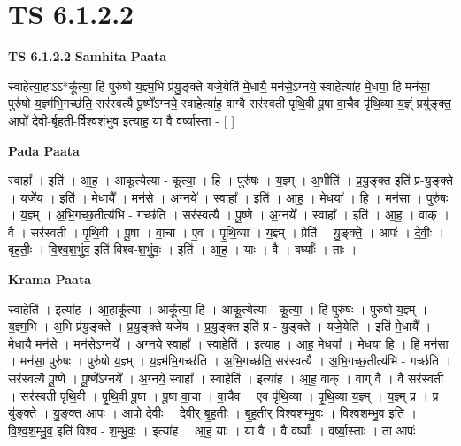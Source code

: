 \documentclass[17pt]{extarticle}
\begin{document}
\section{ TS 6.1.2.2 }

\textbf{TS 6.1.2.2 } \newline
\textbf{Samhita Paata} \newline

स्वाहेत्या॒हाऽऽ*कू᳚त्या॒ हि पुरु॑षो य॒ज्ञ्म॒भि प्र॑यु॒ङ्क्ते यजे॒येति॑ मे॒धायै॒ मन॑से॒ऽग्नये॒ स्वाहेत्या॑ह मे॒धया॒ हि मन॑सा॒ पुरु॑षो य॒ज्ञ्म॑भि॒गच्छ॑ति॒ सर॑स्वत्यै पू॒ष्णे᳚ऽग्नये॒ स्वाहेत्या॑ह॒ वाग्वै सर॑स्वती पृथि॒वी पू॒षा वा॒चैव पृ॑थि॒व्या य॒ज्ञ्ं प्रयु॑ङ्क्त॒ आपो॑ देवी-र्बृहती-र्विश्वशंभुव॒ इत्या॑ह॒ या वै वर्ष्या॒स्ता - [  ] \newline

\textbf{Pada Paata} \newline

स्वाहा᳚ । इति॑ । आ॒ह॒ । आकू॒त्येत्या - कू॒त्या॒ । हि । पुरु॑षः । य॒ज्ञ्म् । अ॒भीति॑ । प्र॒यु॒ङ्क्त इति॑ प्र-यु॒ङ्क्ते । यजे॑य । इति॑ । मे॒धायै᳚ । मन॑से । अ॒ग्नये᳚ । स्वाहा᳚ । इति॑ । आ॒ह॒ । मे॒धया᳚ । हि । मन॑सा । पुरु॑षः । य॒ज्ञ्म् । अ॒भि॒गच्छ॒तीत्य॑भि - गच्छ॑ति । सर॑स्वत्यै । पू॒ष्णे । अ॒ग्नये᳚ । स्वाहा᳚ । इति॑ । आ॒ह॒ । वाक् । वै । सर॑स्वती । पृ॒थि॒वी । पू॒षा । वा॒चा । ए॒व । पृ॒थि॒व्या । य॒ज्ञ्म् । प्रेति॑ । यु॒ङ्क्ते॒ । आपः॑ । दे॒वीः॒ । बृ॒ह॒तीः॒ । वि॒श्व॒श॒भुं॒व॒ इति॑ विश्व-श॒भुं॒वः॒ । इति॑ । आ॒ह॒ । याः । वै । वर्ष्याः᳚ । ताः ।  \newline


\textbf{Krama Paata} \newline

स्वाहेति॑ । इत्या॑ह । आ॒हाकू᳚त्या । आकू᳚त्या॒ हि । आकू॒त्येत्या - कू॒त्या॒ । हि पुरु॑षः । पुरु॑षो य॒ज्ञ्म् । य॒ज्ञ्म॒भि । अ॒भि प्र॑यु॒ङ्‍क्ते । प्र॒यु॒ङ्‍क्ते यजे॑य । प्र॒यु॒ङ्‍क्त इति॑ प्र - यु॒ङ्‍क्ते । यजे॒येति॑ । इति॑ मे॒धायै᳚ । मे॒धायै॒ मन॑से । मन॑से॒ऽग्नये᳚ । अ॒ग्नये॒ स्वाहा᳚ । स्वाहेति॑ । इत्या॑ह । आ॒ह॒ मे॒धया᳚ । मे॒धया॒ हि । हि मन॑सा । मन॑सा॒ पुरु॑षः । पुरु॑षो य॒ज्ञ्म् । य॒ज्ञ्म॑भि॒गच्छ॑ति । अ॒भि॒गच्छ॑ति॒ सर॑स्वत्यै । अ॒भि॒गच्छ॒तीत्य॑भि - गच्छ॑ति । सर॑स्वत्यै पू॒ष्णे । पू॒ष्णे᳚ऽग्नये᳚ । अ॒ग्नये॒ स्वाहा᳚ । स्वाहेति॑ । इत्या॑ह । आ॒ह॒ वाक् । वाग् वै । वै सर॑स्वती । सर॑स्वती पृथि॒वी । पृ॒थि॒वी पू॒षा । पू॒षा वा॒चा । वा॒चैव । ए॒व पृ॑थि॒व्या । पृ॒थि॒व्या य॒ज्ञ्म् । य॒ज्ञ्म् प्र । प्र यु॑ङ्‍क्ते । यु॒ङ्‍क्त॒ आपः॑ । आपो॑ देवीः । दे॒वी॒र् बृ॒ह॒तीः॒ । बृ॒ह॒ती॒र् वि॒श्व॒श॒म्भु॒वः॒ । वि॒श्व॒श॒म्भु॒व॒ इति॑ । वि॒श्व॒श॒म्भु॒व॒ इति॑ विश्व - श॒म्भु॒वः॒ । इत्या॑ह । आ॒ह॒ याः । या वै । वै वर्ष्याः᳚ । वर्ष्या॒स्ताः । ता आपः॑ \newline
\end{document}
